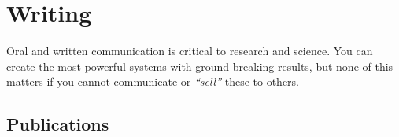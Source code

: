 \documentclass[oneside,11pt]{book}
\begin{document}
\part{Writing}

Oral and written communication is critical to research and science. You can create the most powerful systems with ground breaking results, but none of this matters if you cannot communicate or \emph{``sell''} these to others. 

\chapter{Publications}

% 




\end{document}
